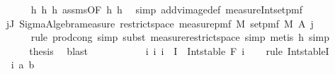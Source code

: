 \begin{isabellebody}
\ \ \ \ \ \ \ \ \isamarkupfalse%
\ h{}\ h{}\ h{}\ assms{\isacharparenleft}{\kern0pt}{}{\isacharparenright}{\kern0pt}{\isacharbrackleft}{\kern0pt}OF\ h{}\ h{}{\isacharbrackright}{\kern0pt}\ \isamarkupfalse%
\ {\isacharparenleft}{\kern0pt}simp\ add{\isacharcolon}{\kern0pt}vimage{\isacharunderscore}{\kern0pt}def\ measure{\isacharunderscore}{\kern0pt}Int{\isacharunderscore}{\kern0pt}set{\isacharunderscore}{\kern0pt}pmf{\isacharparenright}{\kern0pt}\isanewline
\ \ \ \ \ \ \isamarkupfalse%
\ \isamarkupfalse%
\ {\isachardoublequoteopen}{\isachardot}{\kern0pt}{\isachardot}{\kern0pt}{\isachardot}{\kern0pt}\ {\isacharequal}{\kern0pt}\ {\isacharparenleft}{\kern0pt}{\isasymProd}j{\isasymin}J{\isachardot}{\kern0pt}\ Sigma{\isacharunderscore}{\kern0pt}Algebra{\isachardot}{\kern0pt}measure\ {\isacharparenleft}{\kern0pt}restrict{\isacharunderscore}{\kern0pt}space\ {\isacharparenleft}{\kern0pt}measure{\isacharunderscore}{\kern0pt}pmf\ M{\isacharparenright}{\kern0pt}\ {\isacharparenleft}{\kern0pt}set{\isacharunderscore}{\kern0pt}pmf\ M{\isacharparenright}{\kern0pt}{\isacharparenright}{\kern0pt}\ {\isacharparenleft}{\kern0pt}A\ j{\isacharparenright}{\kern0pt}{\isacharparenright}{\kern0pt}{\isachardoublequoteclose}\isanewline
\ \ \ \ \ \ \ \ \isamarkupfalse%
\ {\isacharparenleft}{\kern0pt}rule\ prod{\isachardot}{\kern0pt}cong{\isacharcomma}{\kern0pt}\ simp{\isacharcomma}{\kern0pt}\ subst\ measure{\isacharunderscore}{\kern0pt}restrict{\isacharunderscore}{\kern0pt}space{\isacharcomma}{\kern0pt}\ simp{\isacharcomma}{\kern0pt}\ metis\ h{}{\isacharcomma}{\kern0pt}\ simp{\isacharparenright}{\kern0pt}\isanewline
\ \ \ \ \ \ \isamarkupfalse%
\ \isamarkupfalse%
\ {\isacharquery}{\kern0pt}thesis\ \isamarkupfalse%
\ blast\isanewline
\ \ \ \ \isamarkupfalse%
\isanewline
\ \ \isamarkupfalse%
\isanewline
\isanewline
\ \ \isamarkupfalse%
\ i{\isacharcolon}{\kern0pt}\ {\isachardoublequoteopen}{\isasymAnd}i{\isachardot}{\kern0pt}\ i\ {\isasymin}\ I\ {\isasymLongrightarrow}\ Int{\isacharunderscore}{\kern0pt}stable\ {\isacharparenleft}{\kern0pt}F\ i{\isacharparenright}{\kern0pt}{\isachardoublequoteclose}\isanewline
\ \ \isamarkupfalse%
\ {\isacharparenleft}{\kern0pt}rule\ Int{\isacharunderscore}{\kern0pt}stableI{\isacharparenright}{\kern0pt}\isanewline
\ \ \ \ \isamarkupfalse%
\ i\ a\ b\isanewline

\end{isabellebody}
